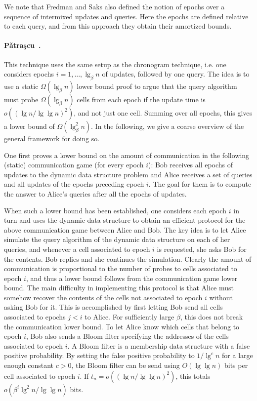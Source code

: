 \documentclass[letterpaper]{article}
\begin{document}
We note that Fredman and Saks also defined the notion of epochs over a
sequence of intermixed updates and queries. Here the epochs are
defined relative to each query, and from this approach they obtain
their amortized bounds.

\paragraph{P{\v a}tra{\c s}cu~\cite{patrascu07sum2D}.}
This technique uses the same setup as the chronogram technique,
i.e. one considers epochs $i=1,\dots,\lg_\beta n$ of updates, followed
by one query. The idea is to use a static $\Omega(\lg_\beta n)$ lower
bound proof to argue that the query algorithm must probe
$\Omega(\lg_\beta n)$ cells from each epoch if the update time is
$o((\lg n/\lg \lg n)^2)$, and not just one cell. Summing over all
epochs, this gives a lower bound of $\Omega(\lg_\beta^2 n)$. In the
following, we give a coarse overview of the general framework for
doing so.

One first proves a lower bound on the amount of communication in the
following (static) communication game (for every epoch $i$): Bob
receives all epochs of updates to the dynamic data structure problem
and Alice receives a set of queries and all updates of the epochs
preceding epoch $i$. The goal for them is to compute the answer to
Alice's queries after all the epochs of updates.

When such a lower bound has been established, one considers each epoch
$i$ in turn and uses the dynamic data structure to obtain an efficient
protocol for the above communication game between Alice and Bob. The
key idea is to let Alice simulate the query algorithm of the dynamic
data structure on each of her queries, and whenever a cell associated
to epoch $i$ is requested, she asks Bob for the contents. Bob replies
and she continues the simulation. Clearly the amount of communication
is proportional to the number of probes to cells associated to epoch
$i$, and thus a lower bound follows from the communication game lower
bound. The main difficulty in implementing this protocol is that Alice
must somehow recover the contents of the cells not associated to epoch
$i$ without asking Bob for it. This is accomplished by first letting
Bob send all cells associated to epochs $j<i$ to Alice. For
sufficiently large $\beta$, this does not break the communication
lower bound. To let Alice know which cells that belong to epoch $i$,
Bob also sends a Bloom filter specifying the addresses of the cells
associated to epoch $i$. A Bloom filter is a membership data
structure with a false positive probability. By setting the false
positive probability to $1/\lg^c n$ for a large enough constant $c>0$,
the Bloom filter can be send using $O(\lg \lg n)$ bits per cell
associated to epoch $i$. If $t_u = o((\lg n/\lg \lg n)^2)$, this
totals $o(\beta^i \lg^2n/\lg\lg n)$ bits.
\end{document}
